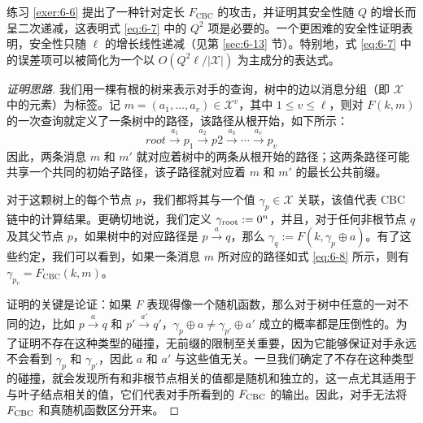 \noindent
练习 \ref{exer:6-6} 提出了一种针对定长 $F_\mathrm{CBC}$ 的攻击，并证明其安全性随 $Q$ 的增长而呈二次递减，这表明式 \ref{eq:6-7} 中的 $Q^2$ 项是必要的。一个更困难的安全性证明表明，安全性只随 $\ell$ 的增长线性递减（见第 \ref{sec:6-13} 节）。特别地，式 \ref{eq:6-7} 中的误差项可以被简化为一个以 $O(Q^2\ell/|\mathcal{X}|)$ 为主成分的表达式。

\begin{proof}[证明思路]
我们用一棵有根的树来表示对手的查询，树中的边以消息分组（即 $\mathcal{X}$ 中的元素）为标签。记 $m=(a_1,\dots,a_v)\in\mathcal{X}^{v}$，其中 $1\leq v\leq\ell$，则对 $F(k,m)$ 的一次查询就定义了一条树中的路径，该路径从根开始，如下所示：
\begin{equation}\label{eq:6-8}
root\overset{a_1}\longrightarrow p_1\overset{a_2}\longrightarrow p2 \overset{a_3}\longrightarrow\cdots \overset{a_v}\longrightarrow p_v
\end{equation}
因此，两条消息 $m$ 和 $m'$ 就对应着树中的两条从根开始的路径；这两条路径可能共享一个共同的初始子路径，该子路径就对应着 $m$ 和 $m'$ 的最长公共前缀。

对于这颗树上的每个节点 $p$，我们都将其与一个值 $\gamma_p\in\mathcal{X}$ 关联，该值代表 CBC 链中的计算结果。更确切地说，我们定义 $\gamma_{\rm root}:=0^n$，并且，对于任何非根节点 $q$ 及其父节点 $p$，如果树中的对应路径是 $p\overset{a}\rightarrow q$，那么 $\gamma_q:=F(k,\gamma_p\oplus a)$。有了这些约定，我们可以看到，如果一条消息 $m$ 所对应的路径如式 \ref{eq:6-8} 所示，则有 $\gamma_{p_v}=F_\mathrm{CBC}(k,m)$。

证明的关键是论证：如果 $F$ 表现得像一个随机函数，那么对于树中任意的一对不同的边，比如 $p\overset{a}\rightarrow q$ 和 $p'\overset{a'}\rightarrow q'$，$\gamma_p\oplus a\neq\gamma_{p'}\oplus a'$ 成立的概率都是压倒性的。为了证明不存在这种类型的碰撞，无前缀的限制至关重要，因为它能够保证对手永远不会看到 $\gamma_p$ 和 $\gamma_{p'}$，因此 $a$ 和 $a'$ 与这些值无关。一旦我们确定了不存在这种类型的碰撞，就会发现所有和非根节点相关的值都是随机和独立的，这一点尤其适用于与叶子结点相关的值，它们代表对手所看到的 $F_{\rm CBC}$ 的输出。因此，对手无法将 $F_{\rm CBC}$ 和真随机函数区分开来。
\end{proof}

